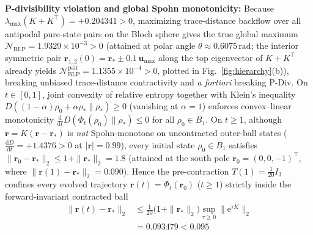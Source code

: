 \documentclass[twocolumn,10pt,amsmath,amssymb,floatfix]{revtex4-2}
\theoremstyle{plain}
\theoremstyle{definition}
\newcommand{\dd}{\mathrm{d}}
\newcommand{\ee}{\mathrm{e}}
\newcommand{\NBLP}{\mathcal{N}_{\mathrm{BLP}}}
\begin{document}
\textbf{P-divisibility violation and global Spohn monotonicity:} Because $\lambda_{\max}(K + K^\top) = +0.204341 > 0$, maximizing trace-distance backflow over all antipodal pure-state pairs on the Bloch sphere gives the true global maximum $\NBLP = 1.9329 \times 10^{-3} > 0$ (attained at polar angle $\theta \approx 0.6075\,\mathrm{rad}$; the interior symmetric pair $\mathbf{r}_{1,2}(0) = \mathbf{r}_* \pm 0.1\,\mathbf{u}_{\max}$ along the top eigenvector of $K + K^\top$ already yields $\NBLP^{\mathrm{pair}} = 1.1355\times 10^{-4} > 0$, plotted in Fig.~\ref{fig:hierarchy}(b)), breaking unbiased trace-distance contractivity and \emph{a fortiori} breaking $\mathrm{P\text{-}Div}$. On $t \in [0,1]$, joint convexity of relative entropy together with Klein's inequality $D((1-\alpha)\rho_0 + \alpha\rho_* \parallel \rho_*) \ge 0$ (vanishing at $\alpha=1$) enforces convex--linear monotonicity $\frac{\dd}{\dd t}D(\Phi_t(\rho_0)\parallel\rho_*) \le 0$ for all $\rho_0 \in B_1$. On $t \ge 1$, although $\dot{\mathbf{r}} = K(\mathbf{r}-\mathbf{r}_*)$ is \emph{not} Spohn-monotone on uncontracted outer-ball states ($\frac{\dd D}{\dd t} = +1.4376 > 0$ at $|\mathbf{r}|=0.99$), every initial state $\rho_0 \in B_1$ satisfies $\|\mathbf{r}_0 - \mathbf{r}_*\|_2 \le 1 + \|\mathbf{r}_*\|_2 = 1.8$ (attained at the south pole $\mathbf{r}_0 = (0,0,-1)^\top$, where $\|\mathbf{r}(1)-\mathbf{r}_*\|_2 = 0.090$). Hence the pre-contraction $T(1) = \frac{1}{20}I_3$ confines every evolved trajectory $\mathbf{r}(t) = \Phi_t(\mathbf{r}_0)$ ($t \ge 1$) strictly inside the forward-invariant contracted ball
\begin{align}
\label{eq:level5_ball}
\|\mathbf{r}(t) - \mathbf{r}_*\|_2
&\le \frac{1}{20}\big(1 + \|\mathbf{r}_*\|_2\big)\sup_{\tau\ge 0}\|\ee^{\tau K}\|_2 \nonumber\\
&= 0.093479 < 0.095
\end{align}
\end{document}
